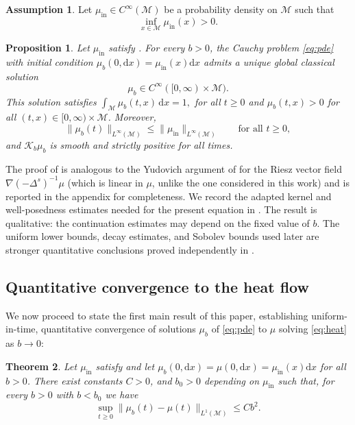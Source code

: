 \documentclass[11pt]{article}
\newtheorem{theorem}{Theorem}[section]
\newtheorem{proposition}[theorem]{Proposition}
\theoremstyle{definition}
\newtheorem{assumption}{Assumption}
\def\K{\mathcal K}
\def\M{\mathcal M}
\def\d{\mathrm{d}}
\begin{document}
\begin{assumption}\label{assump:initial}
Let $\mu_{\mathrm{in}}\in C^\infty( \M)$ be a probability density on  $\M$ such that
\[
\inf_{x\in  \M}\mu_{\mathrm{in}}(x) > 0.
\]
\end{assumption}
\begin{proposition}\label{thm:pde_global_smooth_existence} Let $\mu_{\mathrm{in}}$ satisfy  . For every $b>0$, the Cauchy problem
\eqref{eq:pde} with initial condition $\mu_b(0,\d x)=\mu_{\mathrm{in}}(x)\d x$ admits a unique global classical solution
\[
\mu_b\in C^\infty([0,\infty)\times \M).
\]
This solution satisfies $\int_{ \M}\mu_b(t,x)\,\d x=1,$ for all $t \ge 0$ and  $\mu_b(t,x)>0$ for all $(t,x)\in[0,\infty)\times \M$. 
Moreover,
\[
\|\mu_b(t)\|_{L^\infty( \M)}
\le
\|\mu_{\mathrm{in}}\|_{L^\infty( \M)}
\qquad\text{for all }t\ge0,
\]
and $\K_b\mu_b$ is smooth and strictly positive for all times.
\end{proposition}




The proof of  is analogous
to the Yudovich argument of
\cite[Section~2]{chizat2026quantitative_kmd} for the Riesz vector field $\nabla (-\Delta^s)^{-1}\mu$ (which is linear in $\mu$, unlike the one considered in this work) and is reported in the appendix for completeness. We record the
adapted kernel and well-posedness estimates needed for the present equation in
. The result is qualitative: the
continuation estimates may depend on the fixed value of $b$. The uniform lower
bounds, decay estimates, and Sobolev bounds used later are stronger
quantitative conclusions proved independently in . 


\subsection{Quantitative convergence to the heat flow}\label{subsub:pdeconvergence}
We now proceed to state the first main result of this paper, establishing uniform-in-time, quantitative convergence of solutions $\mu_b$ of \eqref{eq:pde} to $\mu$ solving \eqref{eq:heat} as $b \to 0$:

\begin{theorem}\label{thm:main_convergence}
Let $\mu_{\mathrm{in}}$ satisfy  and let $\mu_b(0,\d x) = \mu(0,\d x)=\mu_{\mathrm{in}}(x)\d x$ for all $b > 0$.  There exist constants $C>0$, and $b_0>0$ depending on $\mu_{\mathrm{in}}$ such that, for every $b>0$ with $b < b_0$ we have
\[
\sup_{t\ge0}\|\mu_b(t)-\mu(t)\|_{L^1( \M)} \le C b^2.
\]
\end{theorem}
\end{document}

